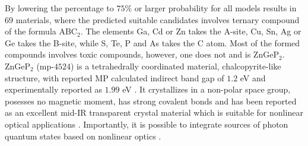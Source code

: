 By lowering the percentage to $75\%$ or larger probability for all models results in $69$ materials, where the predicted suitable candidates involves ternary compound of the formula ABC$_2$. The elements Ga, Cd or Zn takes the A-site, Cu, Sn, Ag or Ge takes the B-site, while S, Te, P and As takes the C atom. Most of the formed compounds involves toxic compounds, however, one does not and is ZnGeP$_2$. ZnGeP$_2$ (mp-$4524$) is a tetrahedrally coordinated material, chalcopyrite-like structure, with reported MP calculated indirect band gap of $1.2$ eV \cite{Zhang2015} and experimentally reported as $1.99$ eV \cite{Xing1989}. It crystallizes in a non-polar space group, posesses no magnetic moment, has strong covalent bonds and has been reported as an excellent mid-IR transparent crystal material which is suitable for nonlinear optical applications \cite{Zhang2015}. Importantly, it is possible to integrate sources of photon quantum states based on nonlinear optics \cite{Caspani2017}. %








